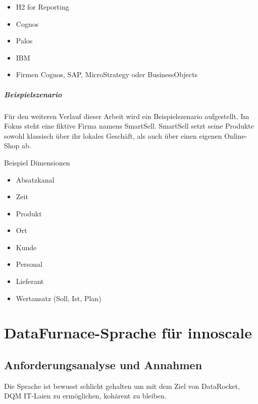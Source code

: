 \documentclass[
  language=german, %
  type=bachelor%
]{isthesis}
\begin{document}
\begin{content}
  \begin{itemize}
    \item H2 for Reporting
    \item Cognos
    \item Palos
    \item IBM
    \item Firmen Cognos, SAP, MicroStrategy oder BusinessObjects
  \end{itemize}

  \paragraph{Beispielszenario}
  Für den weiteren Verlauf dieser Arbeit wird ein Beispielszenario aufgestellt. Im
  Fokus steht eine fiktive Firma namens SmartSell. SmartSell setzt seine
  Produkte sowohl klassisch über ihr lokales Geschäft, als auch über einen
  eigenen Online-Shop ab.

  Beispiel Dimensionen
  \begin{itemize}
    \item Absatzkanal
    \item Zeit
    \item Produkt
    \item Ort
    \item Kunde
    \item Personal
    \item Lieferant
    \item Wertansatz (Soll, Ist, Plan)
  \end{itemize}


  \chapter{DataFurnace-Sprache für innoscale}


  \section{Anforderungsanalyse und Annahmen}
  Die Sprache ist bewusst schlicht gehalten um mit dem Ziel von DataRocket,
  \acrshort{DQM} IT-Laien zu ermöglichen, kohärent zu bleiben.


\end{content}
\end{document}
